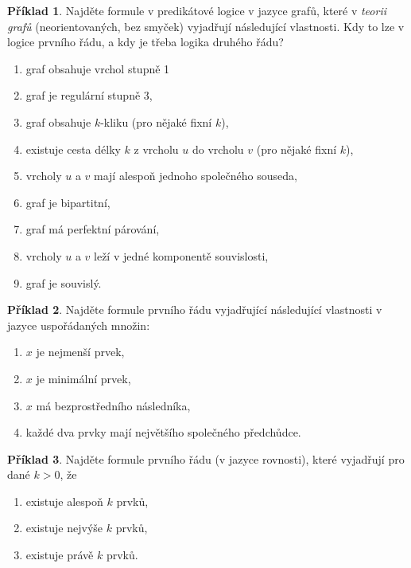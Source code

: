 \documentclass[a4paper]{article}
\theoremstyle{definition}
\newtheorem{problem}{Příklad}
\begin{document}
\medskip\begin{problem}
Najděte formule v predikátové logice v jazyce grafů, které v \emph{teorii grafů} (neorientovaných, bez smyček) vyjadřují následující vlastnosti. Kdy to lze v logice prvního řádu, a kdy je třeba logika druhého řádu?
\begin{enumerate}
    \item graf obsahuje vrchol stupně 1
    \item graf je regulární stupně 3,
    \item graf obsahuje $k$-kliku (pro nějaké fixní $k$),
    \item existuje cesta délky $k$ z vrcholu $u$ do vrcholu $v$ (pro nějaké fixní $k$),
    \item vrcholy $u$ a $v$ mají alespoň jednoho společného souseda,
    \item graf je bipartitní,
    \item graf má perfektní párování,
    \item vrcholy $u$ a $v$ leží v jedné komponentě souvislosti,
    \item graf je souvislý.    
\end{enumerate}
\end{problem}


\medskip\begin{problem} Najděte formule prvního řádu vyjadřující následující vlastnosti v jazyce uspořádaných množin:
\begin{enumerate}
    \item $x$ je nejmenší prvek,
    \item $x$ je minimální prvek,
    \item $x$ má bezprostředního následníka,
    \item každé dva prvky mají největšího společného předchůdce.
\end{enumerate}
\end{problem}


\medskip\begin{problem} Najděte formule prvního řádu (v jazyce rovnosti), které vyjadřují pro dané $k>0$, že
\begin{enumerate}
    \item existuje alespoň $k$ prvků,
    \item existuje nejvýše $k$ prvků,
    \item existuje právě $k$ prvků.
\end{enumerate}
\end{problem}
\end{document}
